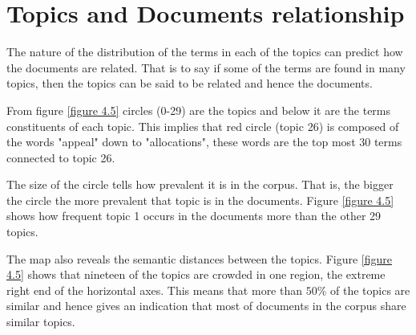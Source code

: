 \section{Topics and Documents relationship}
\begin{flushleft}
The nature of the distribution of the terms in each of the topics can predict how the documents are related. That is to say if some of the terms are found in many topics, then the topics can be said to be  related and hence the documents. 
\end{flushleft}
\begin{flushleft}
From figure \eqref{figure 4.5} circles (0-29) are the topics and below it are the terms constituents of each topic. This implies that red circle (topic 26) is composed of the words "appeal" down to "allocations", these words are the top most 30 terms connected to topic 26.
\end{flushleft}
\begin{flushleft}
The size of the circle tells how prevalent it is in the corpus. That is, the bigger the circle the more prevalent that topic is in the documents. Figure \eqref{figure 4.5} shows how frequent topic 1 occurs in the documents more than the other 29 topics.
\end{flushleft}
\begin{flushleft}
The map  also reveals the semantic distances between the topics. Figure \eqref{figure 4.5} shows that nineteen of the topics are crowded in one region, the extreme  right end of the horizontal axes. This means that more than $50\%$ of the topics are similar and hence gives an indication that most of documents in the corpus share similar topics.
\end{flushleft}
